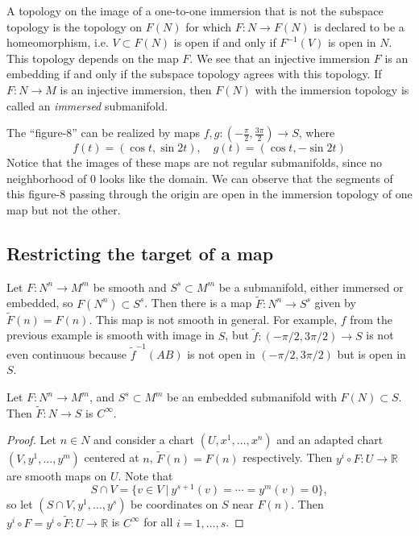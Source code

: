 A topology on the image of a one-to-one immersion that is not the
subspace topology is the topology on $F(N)$ for which
$F: N \to F(N)$ is declared to be a homeomorphism, i.e.
$V \subset F(N)$ is open if and only if $F^{-1}(V)$ is open in $N$.
This topology depends on the map $F$. We see that an injective
immersion $F$ is an embedding if and only if the subspace topology
agrees with this topology. If $F : N \to M$ is an injective immersion,
then $F(N)$ with the immersion topology is called an \emph{immersed}
submanifold.

\begin{xmpl}
The ``figure-8'' can be realized by maps
$f, g: \left(-\frac{\pi}{2}, \frac{3 \pi}{2}\right) \to S$, where
$$
f(t) = (\cos t, \sin 2t), \quad
g(t) = (\cos t, -\sin 2t)
$$
Notice that the images of these maps are not regular submanifolds,
since no neighborhood of 0 looks like the domain. We can observe that
the segments of this figure-8 passing through the origin are open in
the immersion topology of one map but not the other.
\end{xmpl}

\subsection{Restricting the target of a map}
Let $F: N^n \to M^m$ be smooth and $S^s \subset M^m$ be a submanifold,
either immersed or embedded, so $F(N^n) \subset S^s$. Then there is a
map $\tilde{F} : N^n \to S^s$ given by $\tilde{F}(n) = F(n)$. This map
is not smooth in general. For example, $f$ from the previous example
is smooth with image in $S$, but $\tilde{f} : (-\pi/2, 3\pi/2) \to S$
is not even continuous because $\tilde{f}^{-1}(AB)$ is not open in
$(-\pi/2, 3\pi/2)$ but is open in $S$.

\begin{prop}
Let $F : N^n \to M^m$, and $S^s \subset M^m$ be an embedded
submanifold with $F(N) \subset S$. Then
$\tilde{F}: N \to S$ is $C^\infty$.
\end{prop}

\begin{proof}
Let $n \in N$ and consider a chart $(U, x^1, \dots, x^n)$ and an
adapted chart $(V, y^1, \dots, y^m)$ centered at $n$,
$\tilde{F}(n) = F(n)$ respectively. Then
$y^i \circ F : U \to \mathbb{R}$ are smooth maps on $U$. Note that
$$
  S \cap V
= \{ v \in V ~\vert~ y^{s+1}(v) = \cdots = y^m(v) = 0 \},
$$
so let $(S \cap V, y^1, \dots, y^s)$ be coordinates on $S$ near
$F(n)$. Then $y^i \circ F = y^i \circ \tilde{F} : U \to \mathbb{R}$ is
$C^\infty$ for all $i=1, \dots, s$.
\end{proof}
